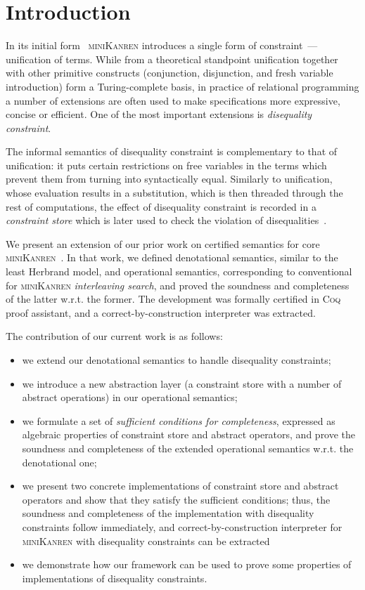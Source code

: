 \section{Introduction}

In its initial form~\cite{TRS,MicroKanren} \textsc{miniKanren} introduces a single
form of constraint~--- unification of terms. While from a theoretical standpoint unification together with other primitive constructs (conjunction, disjunction, and
fresh variable introduction) form a Turing-complete basis, in practice of relational programming a number of extensions are often used to make specifications more
expressive, concise or efficient. One of the most important extensions is \emph{disequality constraint}.

The informal semantics of disequality constraint is complementary to that of unification: it puts certain restrictions on free variables in the terms which
prevent them from turning into syntactically equal. Similarly to unification, whose evaluation results in a substitution, which is then threaded through
the rest of computations, the effect of disequality constraint is recorded in a \emph{constraint store} which is later used to check the violation of
disequalities~\cite{CKanren}.

We present an extension of our prior work on certified semantics for core \textsc{miniKanren}~\cite{CertifiedSemantics}. In that work, we
defined denotational semantics, similar to the least Herbrand model, and operational semantics, corresponding to conventional for \textsc{miniKanren}
\emph{interleaving search}, and proved the soundness and completeness of the latter w.r.t. the former. The development was formally certified in
\textsc{Coq} proof assistant, and a correct-by-construction interpreter was extracted.

The contribution of our current work is as follows:

\begin{itemize}
\item we extend our denotational semantics to handle disequality constraints;
\item we introduce a new abstraction layer (a constraint store with a number of abstract operations) in our operational semantics;
\item we formulate a set of \emph{sufficient conditions for completeness}, expressed as algebraic properties of constraint store and
  abstract operators, and prove the soundness and completeness of the extended operational semantics w.r.t. the denotational one;
\item we present two concrete implementations of constraint store and abstract operators and show that they satisfy the
  sufficient conditions; thus, the soundness and completeness of the implementation with disequality constraints follow
  immediately, and correct-by-construction interpreter for \textsc{miniKanren} with disequality constraints
  can be extracted
\item we demonstrate how our framework can be used to prove some properties of implementations of disequality constraints.
\end{itemize}
